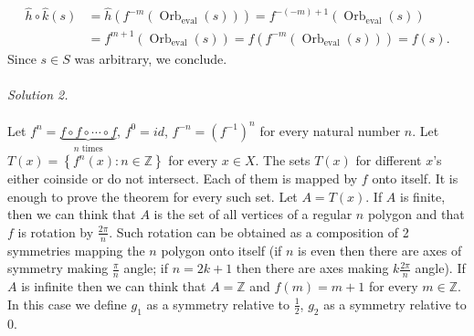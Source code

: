 \begin{solution}
\begin{align*}
        \hat{h} \circ \hat{k}(s) &= \hat{h}\left( f^{-m}\left( \operatorname{Orb}_{\operatorname{eval}}(s) \right) \right) = f^{-(-m)+1}\left( \operatorname{Orb}_{\operatorname{eval}}(s) \right)
        \\
        &= f^{m+1}\left( \operatorname{Orb}_{\operatorname{eval}}(s) \right) = f\left( f^{-m}\left( \operatorname{Orb}_{\operatorname{eval}}(s) \right) \right) = f(s).
    \end{align*}
    Since \( s \in S \) was arbitrary, we conclude.
    \\\\
    \textit{Solution 2.}
    \\\\
    Let \( f^n = \underbrace{f \circ f \circ \cdots \circ f}_{n \text{ times}} \), \( f^0 = id \), \( f^{-n} = \left(f^{-1}\right)^n \) for every natural number \( n \). Let \( T\left(x\right) = \left\{ f^n\left(x\right) : n \in \mathbb{Z} \right\} \) for every \( x \in X \). The sets \( T\left(x\right) \) for different \( x \)'s either coinside or do not intersect. Each of them is mapped by \( f \) onto itself. It is enough to prove the theorem for every such set. Let \( A = T\left(x\right) \). If \( A \) is finite, then we can think that \( A \) is the set of all vertices of a regular \( n \) polygon and that \( f \) is rotation by \( \frac{2\pi}{n} \). Such rotation can be obtained as a composition of 2 symmetries mapping the \( n \) polygon onto itself (if \( n \) is even then there are axes of symmetry making \( \frac{\pi}{n} \) angle; if \( n = 2k+1 \) then there are axes making \( k\frac{2\pi}{n} \) angle). If \( A \) is infinite then we can think that \( A = \mathbb{Z} \) and \( f\left(m\right) = m+1 \) for every \( m \in \mathbb{Z} \). In this case we define \( g_1 \) as a symmetry relative to \( \frac{1}{2} \), \( g_2 \) as a symmetry relative to \( 0 \).
\end{solution}
